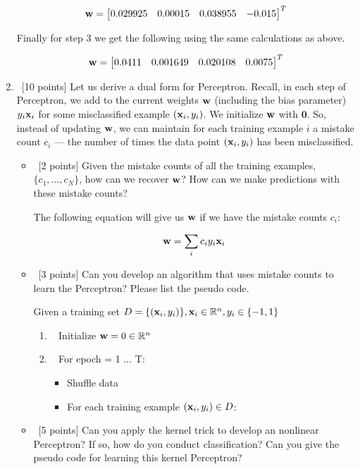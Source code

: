 \documentclass[12pt, fullpage,letterpaper]{article}
\begin{document}
\begin{enumerate}
	
	\begin{align*}
		{\bf w} = \begin{bmatrix}0.029925 & 0.00015 & 0.038955 & -0.015\end{bmatrix}^T
	\end{align*}
	
	Finally for step 3 we get the following using the same calculations as above.
	
	\begin{align*}
		{\bf w} = \begin{bmatrix}0.0411 & 0.001649 & 0.020108 & 0.0075\end{bmatrix}^T
	\end{align*}
	

	\item~[10 points] Let us derive a dual form for Perceptron. Recall, in each step of Perceptron, we add to the current weights ${\bf w}$ (including the bias parameter) $y_i{\bf x}_i$ for some misclassified example $({\bf x}_i, y_i)$. We initialize ${\bf w}$ with $\mathbf{0}$. So, instead of updating ${\bf w}$, we can maintain for each training example $i$ a mistake count $c_i$ --- the number of times the data point $({\bf x}_i, y_i)$ has been misclassified. 
	
	\begin{itemize}
		\item~[2 points] Given the mistake counts of all the training examples, $\{c_1, \ldots, c_N\}$, how can we recover ${\bf w}$? How can we make predictions with these mistake counts? 
		
		The following equation will give us ${\bf w}$ if we have the mistake counts $c_i$:
		
		\begin{align*}
			{\bf w} = \sum_i c_i y_i {\bf x}_i			
		\end{align*}
		
		\item~[3 points] Can you develop an algorithm that uses mistake counts to learn the Perceptron? Please list the pseudo code. 
		
		Given a training set $D=\{({\bf x}_i,y_i)\}, {\bf x}_i \in \mathbb{R}^n, y_i \in \{-1,1\}$
		
		\begin{enumerate}
			\item~ Initialize ${\bf w} = 0 \in \mathbb{R}^n$
			\item~ For epoch = 1 ... T:
			\begin{itemize}
				\item Shuffle data
				\item For each training example $({\bf x}_i, y_i) \in D$:
				
			\end{itemize}
		\end{enumerate}
		
		
		\item~[5 points] Can you apply the kernel trick to develop an nonlinear Perceptron? If so, how do you conduct classification? Can you give the pseudo code for learning this kernel Perceptron? 
	\end{itemize}   
	
\end{enumerate}
\end{document}
